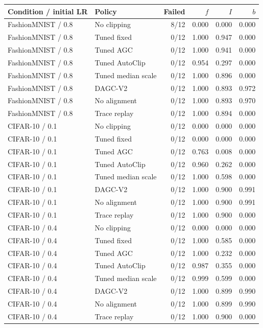 \begin{tabular}{llrrrr}
\toprule
Condition / initial LR & Policy & Failed & $f$ & $I$ & $b$ \\
\midrule
FashionMNIST / 0.8 & No clipping & 8/12 & 0.000 & 0.000 & 0.000 \\
FashionMNIST / 0.8 & Tuned fixed & 0/12 & 1.000 & 0.947 & 0.000 \\
FashionMNIST / 0.8 & Tuned AGC & 0/12 & 1.000 & 0.941 & 0.000 \\
FashionMNIST / 0.8 & Tuned AutoClip & 0/12 & 0.954 & 0.297 & 0.000 \\
FashionMNIST / 0.8 & Tuned median scale & 0/12 & 1.000 & 0.896 & 0.000 \\
FashionMNIST / 0.8 & DAGC-V2 & 0/12 & 1.000 & 0.893 & 0.972 \\
FashionMNIST / 0.8 & No alignment & 0/12 & 1.000 & 0.893 & 0.970 \\
FashionMNIST / 0.8 & Trace replay & 0/12 & 1.000 & 0.894 & 0.000 \\
CIFAR-10 / 0.1 & No clipping & 0/12 & 0.000 & 0.000 & 0.000 \\
CIFAR-10 / 0.1 & Tuned fixed & 0/12 & 0.000 & 0.000 & 0.000 \\
CIFAR-10 / 0.1 & Tuned AGC & 0/12 & 0.763 & 0.008 & 0.000 \\
CIFAR-10 / 0.1 & Tuned AutoClip & 0/12 & 0.960 & 0.262 & 0.000 \\
CIFAR-10 / 0.1 & Tuned median scale & 0/12 & 1.000 & 0.598 & 0.000 \\
CIFAR-10 / 0.1 & DAGC-V2 & 0/12 & 1.000 & 0.900 & 0.991 \\
CIFAR-10 / 0.1 & No alignment & 0/12 & 1.000 & 0.900 & 0.991 \\
CIFAR-10 / 0.1 & Trace replay & 0/12 & 1.000 & 0.900 & 0.000 \\
CIFAR-10 / 0.4 & No clipping & 0/12 & 0.000 & 0.000 & 0.000 \\
CIFAR-10 / 0.4 & Tuned fixed & 0/12 & 1.000 & 0.585 & 0.000 \\
CIFAR-10 / 0.4 & Tuned AGC & 0/12 & 1.000 & 0.232 & 0.000 \\
CIFAR-10 / 0.4 & Tuned AutoClip & 0/12 & 0.987 & 0.355 & 0.000 \\
CIFAR-10 / 0.4 & Tuned median scale & 0/12 & 0.999 & 0.599 & 0.000 \\
CIFAR-10 / 0.4 & DAGC-V2 & 0/12 & 1.000 & 0.899 & 0.990 \\
CIFAR-10 / 0.4 & No alignment & 0/12 & 1.000 & 0.899 & 0.990 \\
CIFAR-10 / 0.4 & Trace replay & 0/12 & 1.000 & 0.900 & 0.000 \\
\bottomrule
\end{tabular}
